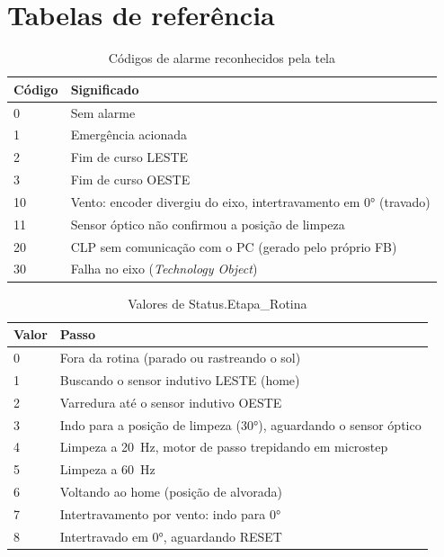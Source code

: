 \documentclass[12pt, oneside, a4paper, chapter=TITLE, section=TITLE, english, brazil]{abntex2}
\begin{document}
\chapter{Tabelas de referência}

\begin{table}[htbp]
\centering
\caption{Códigos de alarme reconhecidos pela tela}
\label{tab:alarmes}
\begin{tabular}{p{}p{}}
\toprule
\textbf{Código} & \textbf{Significado} \\
\midrule
0 & Sem alarme \\
1 & Emergência acionada \\
2 & Fim de curso LESTE \\
3 & Fim de curso OESTE \\
10 & Vento: encoder divergiu do eixo, intertravamento em 0° (travado) \\
11 & Sensor óptico não confirmou a posição de limpeza \\
20 & CLP sem comunicação com o PC (gerado pelo próprio FB) \\
30 & Falha no eixo (\emph{Technology Object}) \\
\bottomrule
\end{tabular}
\end{table}

\begin{table}[htbp]
\centering
\caption{Valores de Status.Etapa\_Rotina}
\label{tab:etapas}
\begin{tabular}{p{}p{}}
\toprule
\textbf{Valor} & \textbf{Passo} \\
\midrule
0 & Fora da rotina (parado ou rastreando o sol) \\
1 & Buscando o sensor indutivo LESTE (home) \\
2 & Varredura até o sensor indutivo OESTE \\
3 & Indo para a posição de limpeza (30°), aguardando o sensor óptico \\
4 & Limpeza a 20~Hz, motor de passo trepidando em microstep \\
5 & Limpeza a 60~Hz \\
6 & Voltando ao home (posição de alvorada) \\
7 & Intertravamento por vento: indo para 0° \\
8 & Intertravado em 0°, aguardando RESET \\
\bottomrule
\end{tabular}
\end{table}
\end{document}
